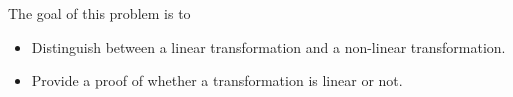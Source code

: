 \documentclass{workbook}
\newcommand{\bookonlynewpage}{\begin{bookonly}\newpage\end{bookonly}}
\begin{document}
\begin{slide}
	\bookonlynewpage

	\question
	\begin{annotation}
		\begin{goals}

			The goal of this problem is to
			\begin{itemize}
				\item Distinguish between a linear transformation and a non-linear transformation.
				\item Provide a proof of whether a transformation is linear or not.
			\end{itemize}
		\end{goals}


\end{annotation}
\end{slide}
\end{document}
